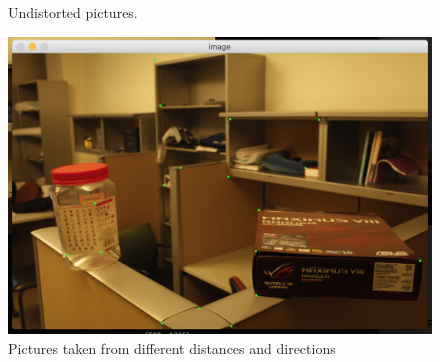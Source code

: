 \documentclass[10pt,twocolumn,letterpaper]{article}
\begin{document}
\begin{figure}[t]
\centering
{}

\caption{Undistorted pictures.}
\label{fig:undistorted}
\end{figure}


\begin{figure}[t]
\centering
\includegraphics[width=\columnwidth]{images/pick}

\caption{Pictures taken from different distances and directions}
\label{fig:pick}
\end{figure}
\end{document}
